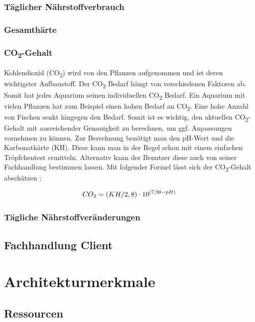 \subsubsection{Täglicher Nährstoffverbrauch}

\subsubsection{Gesamthärte}

\subsubsection{CO\textsubscript{2}-Gehalt}

Kohlendioxid (CO\textsubscript{2}) wird von den Pflanzen aufgenommen und ist deren wichtigster Aufbaustoff. Der CO\textsubscript{2} Bedarf hängt von verschiedenen Faktoren ab. Somit hat jedes Aquarium seinen individuellen CO\textsubscript{2} Bedarf. Ein Aquarium mit vielen Pflanzen hat zum Beispiel einen hohen Bedarf an CO\textsubscript{2}. Eine hohe Anzahl von Fischen senkt hingegen den Bedarf. Somit ist es wichtig, den aktuellen CO\textsubscript{2}-Gehalt mit ausreichender Genauigkeit zu berechnen, um ggf. Anpassungen vornehmen zu können. Zur Berechnung benötigt man den pH-Wert und die Karbonathärte (KH). Diese kann man in der Regel schon mit einem einfachen Tröpfchentest ermitteln. Alternativ kann der Benutzer diese auch von seiner Fachhandlung bestimmen lassen. Mit folgender Formel lässt sich der CO\textsubscript{2}-Gehalt abschätzen \autocite{Formel:CO2}:

\begin{equation}
CO\textsubscript{2} = (KH/2,8)\cdot10^{(7,90-pH)}
\end{equation}

\subsubsection{Tägliche Nährstoffveränderungen}

\subsection{Fachhandlung Client}

\section{Architekturmerkmale}

\subsection{Ressourcen}

